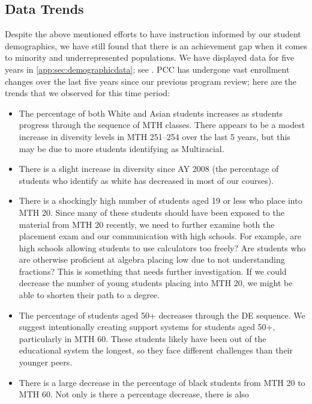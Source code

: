 \subsection{Data Trends}\label{needs:sec:trends}
Despite the above mentioned efforts to have instruction informed by our student
demographics, we have still found that there is an achievement gap when it
comes to minority and underrepresented populations. We have displayed data for
five years in \vref{app:sec:demographicdata}; see
. PCC has
undergone vast enrollment changes over the last five years since our previous
program review; here are the trends that we observed for this time period:
\begin{itemize}
    \item The percentage of both White and Asian students increases as students
      progress through the sequence of MTH classes. There appears to be a
      modest increase in diversity levels in MTH 251--254 over the last 5
      years, but this may be due to more students identifying as Multiracial.
    \item There is a slight increase in diversity since AY 2008 (the percentage
      of students who identify as white has decreased in most of our courses).  
    \item There is a shockingly high number of students aged 19 or less who
      place into MTH 20. Since many of these students should have been exposed
      to the material from MTH 20 recently, we need to further examine both the placement
      exam and our communication with high schools. For example, are high
      schools allowing students to use calculators too freely? Are students who
      are otherwise proficient at algebra placing low due to not understanding
      fractions? This is something that needs further investigation. If we
      could decrease the number of young students placing into MTH 20, we might
      be able to shorten their path to a degree.
    \item The percentage of students aged 50+ decreases through the DE
      sequence. We suggest intentionally creating support systems for students 
      aged 50+, particularly in MTH 60. These students likely have been out of
      the educational system the longest, so they face different challenges
      than their younger peers.
    \item There is a large decrease in the percentage of black students from
      MTH 20 to MTH 60. Not only is there a percentage decrease, there is also

\end{itemize}

